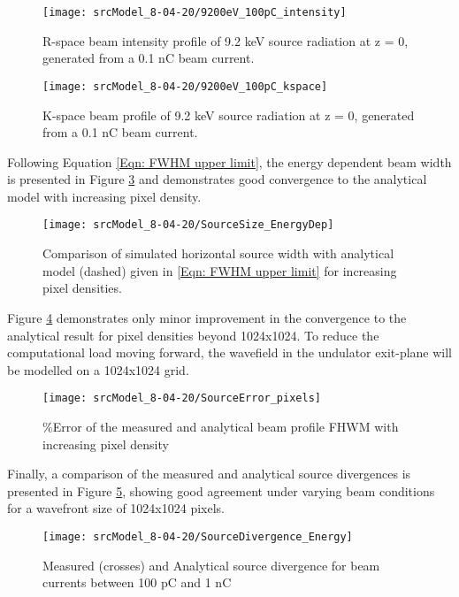 \documentclass[]{scrartcl}
\begin{document}
\begin{figure}[H]
	\centering
	\texttt{[image: srcModel\_8-04-20/9200eV\_100pC\_intensity]}
	\caption{R-space beam intensity profile of 9.2 keV source radiation at z = 0, generated from a 0.1 nC beam current.}
	\label{Coherent Beam Intensity Profile R-space}
\end{figure}

\begin{figure}[H] 
	\centering
	\texttt{[image: srcModel\_8-04-20/9200eV\_100pC\_kspace]}
	\caption{K-space beam profile of 9.2 keV source radiation at z = 0, generated from a 0.1 nC beam current.}
	\label{Coherent Beam Profile K-space}
\end{figure}

 Following Equation \ref{Eqn: FWHM upper limit}, the energy dependent beam width is presented in Figure \ref{Fig: Energy Dependent Source Size} and demonstrates good convergence to the analytical model with increasing pixel density.\\
 
 \begin{figure}[H]
 	\centering
 	\texttt{[image: srcModel\_8-04-20/SourceSize\_EnergyDep]}
 	\caption{Comparison of simulated horizontal source width with analytical model (dashed) given in \ref{Eqn: FWHM upper limit} for increasing pixel densities.}
 	\label{Fig: Energy Dependent Source Size}
 \end{figure}

Figure \ref{Fig: FWHM Error} demonstrates only minor improvement in the convergence to the analytical result for pixel densities beyond 1024x1024. To reduce the computational load moving forward, the wavefield in the undulator exit-plane will be modelled on a 1024x1024 grid.

\begin{figure}[H]
	\centering
	\texttt{[image: srcModel\_8-04-20/SourceError\_pixels]}
	\caption{\%Error of the measured and analytical beam profile FHWM with increasing pixel density}
		\label{Fig: FWHM Error}
	\end{figure}


Finally, a comparison of the measured and analytical source divergences is presented in Figure \ref*{Fig: Coherent Source Divergence}, showing good agreement under varying beam conditions for a wavefront size of 1024x1024 pixels.

\begin{figure}[H]
	\centering
	\texttt{[image: srcModel\_8-04-20/SourceDivergence\_Energy]}
	\caption{Measured (crosses) and Analytical source divergence for beam currents between 100 pC and 1 nC}
	\label{Fig: Coherent Source Divergence}
\end{figure}
\end{document}
